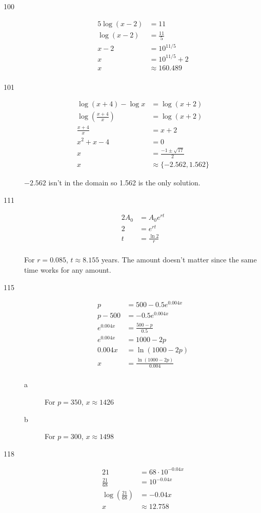 \documentclass[fleqn,addpoints]{exam}
\begin{document}
\begin{description}
\item[100]
\begin{align*}
  5 \log(x-2) &= 11 \\
  \log(x-2) &= \frac{11}{5} \\
  x-2 &= 10^{11/5} \\
  x &= 10^{11/5} + 2 \\
  x &\approx 160.489 \\
\end{align*}

\item[101]
\begin{align*}
  \log(x+4) - \log x &= \log(x+2) \\
  \log \left( \frac{x+4}{x} \right) &= \log(x+2) \\
  \frac{x+4}{x} &= x+2 \\
   x^2 + x - 4 &= 0 \\
   x &= \frac{-1 \pm \sqrt{17}}{2} \\
   x &\approx \{ -2.562, 1.562 \}
\end{align*}

$-2.562$ isn't in the domain so 1.562 is the only solution.

\item[111]
\begin{align*}
  2A_0 &= A_0 e^{rt} \\
  2 &= e^{rt} \\
  t &= \frac{\ln 2}{r} \\
\end{align*}

For $r = 0.085$, $t \approx 8.155$ years.  The amount doesn't matter since the same time works for any amount.

\item[115]
\begin{align*}
  p &= 500 - 0.5 e^{0.004x} \\
  p - 500 &= -0.5 e^{0.004x} \\
  e^{0.004x} &= \frac{500 - p}{0.5} \\
  e^{0.004x} &= 1000 - 2p \\
  0.004x &= \ln(1000 - 2p) \\
  x &= \frac{\ln(1000 - 2p)}{0.004} \\
\end{align*}

\begin{description}
\item[a]
For $p = 350$, $x \approx 1426$

\item[b]
For $p = 300$, $x \approx 1498$
\end{description}

\item[118]
\begin{align*}
  21 &= 68 \cdot 10^{-0.04x} \\
  \frac{21}{68} &= 10^{-0.04x} \\
  \log \left( \frac{21}{68} \right) &= -0.04x \\
  x &\approx 12.758 \\
\end{align*}

\end{description}
\end{document}

